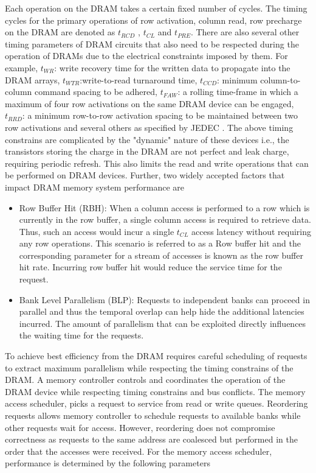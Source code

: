 \par Each operation on the DRAM takes a certain fixed number of cycles. The timing cycles for the primary operations of row activation, column read, row precharge on the DRAM are denoted as $t_{RCD}$ , $t_{CL}$ and $t_{PRE}$. There are also several other timing parameters of DRAM circuits that also need to be respected during the operation of DRAMs due to the electrical constraints imposed by them. For example, $t_{WR}$: write recovery time for the written data to propagate into the DRAM arrays, $t_{WTR}$:write-to-read turnaround time, $t_{CCD}$: minimum column-to-column command spacing to be adhered, $t_{FAW}$: a rolling time-frame in which a maximum of four row activations on the same DRAM device can be engaged, $t_{RRD}$: a minimum row-to-row activation spacing to be maintained between two row activations and several others as specified by JEDEC \cite{jedec-ddr3}. The above timing constrains are complicated by the "dynamic" nature of these devices i.e., the transistors storing the charge in the DRAM are not perfect and leak charge, requiring periodic refresh. This also limits the read and write operations that can be performed on DRAM devices.
Further, two widely accepted factors that impact DRAM memory system performance are
\begin{itemize}
	\item Row Buffer Hit (RBH): When a column access is performed to a row which is currently in the row buffer, a single column access is required to retrieve data. Thus, such an access would incur a single $t_{CL}$ access latency without requiring any row operations. This scenario is referred to as a Row buffer hit and the corresponding parameter for a stream of accesses is known as the row buffer hit rate. Incurring row buffer hit would reduce the service time for the request. 
	\item Bank Level Parallelism (BLP): Requests to independent banks can proceed in parallel and thus the temporal overlap can help hide the additional latencies incurred. The amount of parallelism that can be exploited directly influences the waiting time for the requests.
\end{itemize}
\par To achieve best efficiency from the DRAM requires careful scheduling of requests to extract maximum parallelism while respecting the timing constrains of the DRAM. A memory controller controls and coordinates the operation of the DRAM device while respecting timing constrains and bus conflicts. The memory access scheduler, picks a request to service from read or write queues. Reordering requests allows memory controller to schedule requests to available banks while other requests wait for access. However, reordering does not compromise correctness as requests to the same address are coalesced but performed in the order that the accesses were received. For the memory access scheduler, performance is determined by the following parameters
